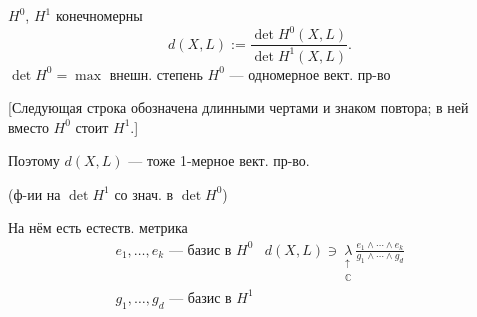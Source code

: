 $H^0$, $H^1$ конечномерны
\begin{equation*}
d(X,L):=\frac{\det H^0(X,L)}{\det H^1(X,L)}.\tag{6}
\end{equation*}
$\det H^0=\max$ внешн. степень $H^0$ — одномерное вект. пр-во

[Следующая строка обозначена длинными чертами и знаком повтора; в ней вместо $H^0$ стоит $H^1$.]

Поэтому $d(X,L)$ — тоже 1-мерное вект. пр-во.

(ф-ии на $\det H^1$ со знач. в $\det H^0$)

На нём есть естеств. метрика
\begin{equation*}
\begin{array}{l|l}
e_1,\ldots,e_k\text{ — базис в }H^0&
\displaystyle d(X,L)\ni
\underset{\substack{\uparrow\\\mathbb C}}{\lambda}
\frac{e_1\wedge\cdots\wedge e_k}{g_1\wedge\cdots\wedge g_d}\\
g_1,\ldots,g_d\text{ — базис в }H^1&
\end{array}
\end{equation*}


